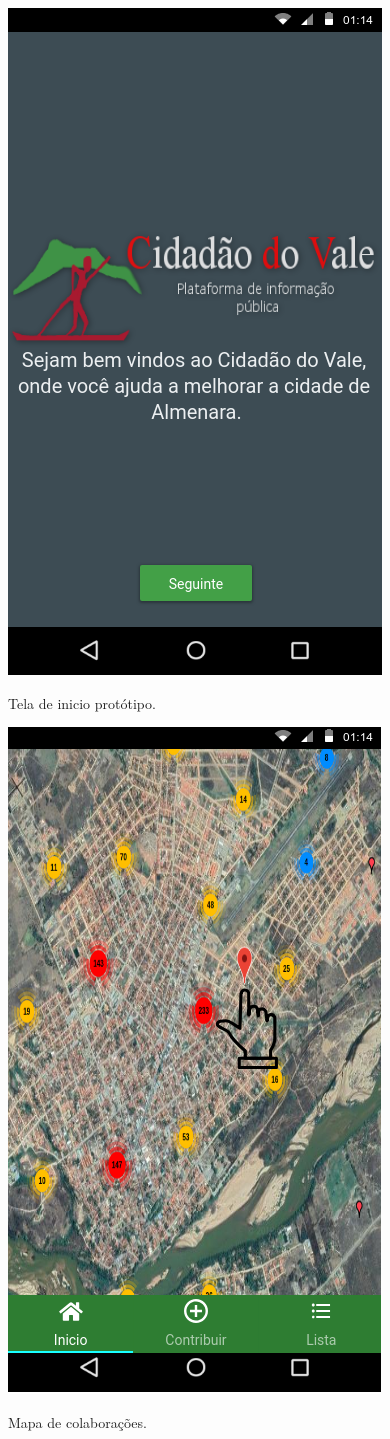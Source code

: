    \begin{figure}[H]
    	\centering
    	\caption{Tela de inicio protótipo.}	
    	\includegraphics[width=0.6\linewidth, frame]{Imagens/protInicio.png}
    	\label{fig:protInicio}
    \end{figure}
    
    \begin{figure}[H]
    	\centering
    	\caption{Mapa de colaborações.}	
    	\includegraphics[width=0.6\linewidth, frame]{Imagens/protMap.png}
    	\label{fig:protMap}
    \end{figure} 
    
